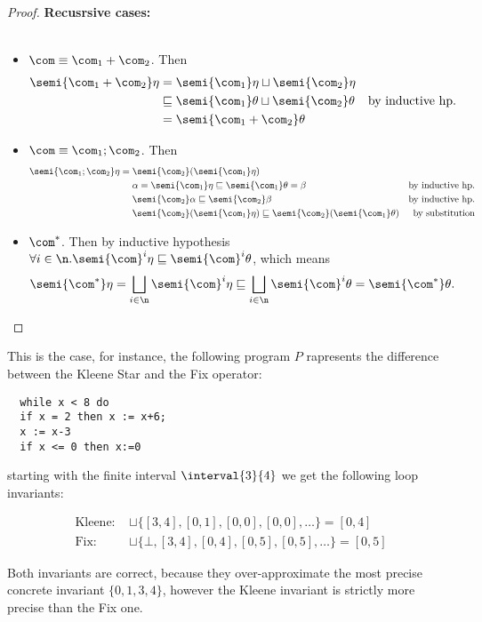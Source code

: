 \begin{proof}
  \noindent
  \textbf{Recusrsive cases:}\ \\ \
  \begin{itemize}
  \item \(\com \equiv \com_1 + \com_2\). Then
    \begin{align*}
      \semi{\com_1 + \com_2}\eta & = \semi{\com_1}\eta \sqcup \semi{\com_2}\eta & \\
      & \sqsubseteq \semi{\com_1}\theta \sqcup \semi{\com_2}\theta & \text{by inductive hp.} \\
      & = \semi{\com_1 + \com_2}\theta
    \end{align*}
  \item \(\com \equiv \com_1 ; \com_2\). Then
    \begin{align*}
      \semi{\com_1;\com_2}\eta = \; & \semi{\com_2}(\semi{\com_1}\eta) & \\
      & \alpha = \semi{\com_1}\eta \sqsubseteq \semi{\com_1}\theta = \beta & \text{by inductive hp.} \\
      & \semi{\com_2}\alpha \sqsubseteq \semi{\com_2}\beta & \text{by inductive hp.} \\
      & \semi{\com_2}(\semi{\com_1}\eta) \sqsubseteq \semi{\com_2}(\semi{\com_1}\theta) & \text{by substitution}
    \end{align*}
  \item \(\com^*\). Then by inductive hypothesis \(\forall i \in \n
    . \semi{\com}^i\eta \sqsubseteq \semi{\com}^i\theta\), which means
    \[\semi{\com^*}\eta = \bigsqcup_{i\in\n}\semi{\com}^i\eta \sqsubseteq
    \bigsqcup_{i\in\n}\semi{\com}^i\theta = \semi{\com^*}\theta.\]
  \end{itemize}
\end{proof}

\begin{example} \label{ex:fix}
  This is the case, for instance, the following program \(P\)
  rapresents the difference between the Kleene Star and the Fix
  operator:
\begin{verbatim}
  while x < 8 do
  if x = 2 then x := x+6;
  x := x-3
  if x <= 0 then x:=0
\end{verbatim}
starting with the finite interval \(\interval{3}{4}\) we get the
following loop invariants:

\begin{align*}
  \text{Kleene: } &\sqcup\{[3,4], [0,1], [0,0], [0,0], \ldots\} = [0,4]\\[5pt]
  \text{Fix: } & \sqcup\{\bot, [3,4], [0,4], [0,5], [0,5],\ldots\} = [0,5]
\end{align*}

\noindent
Both invariants are correct, because they over-approximate the most
precise concrete invariant \(\{0,1,3,4\}\), however the Kleene
invariant is strictly more precise than the Fix one.
\end{example}

